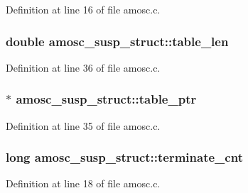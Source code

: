 Definition at line 16 of file amosc.\+c.

\subsubsection[{\texorpdfstring{table\+\_\+len}{table_len}}]{\setlength{\rightskip}{0pt plus 5cm}double amosc\+\_\+susp\+\_\+struct\+::table\+\_\+len}\hypertarget{structamosc__susp__struct_a0d368aa9d9cbce3f1d066342355bdd08}{}\label{structamosc__susp__struct_a0d368aa9d9cbce3f1d066342355bdd08}


Definition at line 36 of file amosc.\+c.

\subsubsection[{\texorpdfstring{table\+\_\+ptr}{table_ptr}}]{$\ast$ amosc\+\_\+susp\+\_\+struct\+::table\+\_\+ptr}\hypertarget{structamosc__susp__struct_a6444ca2d19cc228b6314dd10e3e78642}{}\label{structamosc__susp__struct_a6444ca2d19cc228b6314dd10e3e78642}


Definition at line 35 of file amosc.\+c.

\subsubsection[{\texorpdfstring{terminate\+\_\+cnt}{terminate_cnt}}]{\setlength{\rightskip}{0pt plus 5cm}long amosc\+\_\+susp\+\_\+struct\+::terminate\+\_\+cnt}\hypertarget{structamosc__susp__struct_a17e669db1994d4f58a6cdd3e7ec9d4fa}{}\label{structamosc__susp__struct_a17e669db1994d4f58a6cdd3e7ec9d4fa}


Definition at line 18 of file amosc.\+c.


